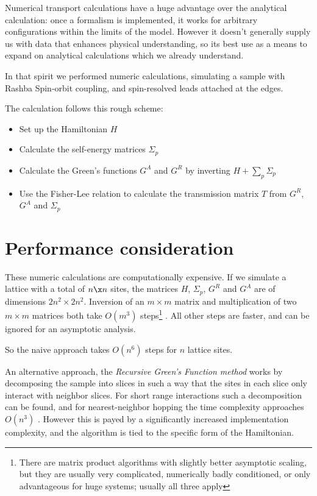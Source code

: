 

Numerical transport calculations have a huge advantage over the analytical
calculation: once a formalism is implemented, it works for arbitrary
configurations within the limits of the model. However it doesn't generally
supply us with data that enhances physical understanding, so its best use as a
means to expand on analytical calculations which we already understand.

In that spirit we performed numeric calculations, simulating a sample with
Rashba Spin-orbit coupling, and spin-resolved leads attached at the edges.

The calculation follows this rough scheme:

\begin{itemize}
    \item Set up the Hamiltonian $H$
    \item Calculate the self-energy matrices $\Sigma_p$
    \item Calculate the Green's functions $G^A$ and $G^R$ by inverting
          $H + \sum_p \Sigma_p$
    \item Use the Fisher-Lee relation to calculate the transmission matrix $T$
            from $G^R$, $G^A$ and $\Sigma_p$
\end{itemize}

\section*{Performance consideration}

These numeric calculations are computationally expensive. If we simulate a
lattice with a total of $n \x n$ sites, the matrices $H$, $\Sigma_p$, $G^R$ and
$G^A$ are of dimensions $2n^2 \times 2n^2$. Inversion of an $m \times m $
matrix and multiplication of two $ m \times m $ matrices both take $O(m^3)$
steps\footnote{There are matrix product algorithms with slightly better
asymptotic scaling, but they are usually very complicated, numerically badly
conditioned, or only advantageous for huge systems; usually all three apply}
\cite{matrixperformance}. All other steps are faster, and can be ignored for
an asymptotic analysis.

So the naive approach takes $O(n^6)$ steps for $n$ lattice sites.

An alternative approach, the \emph{Recursive Green's Function method} works by
decomposing the sample into slices in such a way that the sites in each slice
only interact with neighbor slices. For short range interactions such a
decomposition can be found, and for nearest-neighbor hopping the time
complexity approaches $O(n^3)$ \cite{rgfschmelcher}. However this is payed by
a significantly increased implementation complexity, and the algorithm is tied
to the specific form of the Hamiltonian.

